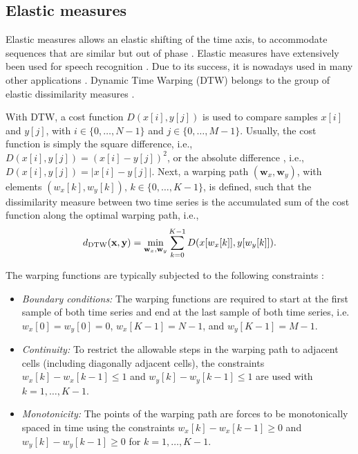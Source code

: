 \documentclass[10pt,final,a4paper,oneside,onecolumn]{article}
\newcommand{\ddtw}{d_{\textup{DTW}}}
\theoremstyle{plain}\newtheorem{definition}{Definition}[section]    %
\theoremstyle{definition}\newtheorem{example}{Example}[section]     %
\theoremstyle{remark}\newtheorem{remarkenv}{Remark}[section]        %
\begin{document}
\subsection{Elastic measures}
\label{sec:elastic measures}

Elastic measures allows an elastic shifting of the time axis, to accommodate sequences that are similar but out of phase \cite{keogh2005exactDTW}. Elastic measures have extensively been used for speech recognition \cite{rabiner1993speech, muller2007information}. Due to its success, it is nowadays used in many other applications \cite{serra2014empirical, wang2013distancemeasures}. Dynamic Time Warping (DTW) \cite{sakoe1978dynamic, berndt1994using} belongs to the group of elastic dissimilarity measures \cite{wang2013distancemeasures}.

With DTW, a cost function $D(x[i], y[j])$ is used to compare samples $x[i]$ and $y[j]$, with $i \in \{0, \ldots, N-1\}$ and $j \in \{0, \ldots, M-1\}$. Usually, the cost function is simply the square difference, i.e., $D(x[i], y[j]) = (x[i]-y[j])^2$, or the absolute difference \cite{berndt1994using}, i.e., $D(x[i], y[j])=|x[i] - y[j]|$. Next, a warping path $(\textbf{w}_x, \textbf{w}_y)$, with elements $(w_x[k], w_y[k]),\,k \in \{0, \ldots, K-1\}$, is defined, such that the dissimilarity measure between two time series is the accumulated sum of the cost function along the optimal warping path, i.e.,
\begin{equation} \label{eq:dtw cost}
	\ddtw(\textbf{x}, \textbf{y}) = \min_{\textbf{w}_x, \textbf{w}_y} \sum_{k=0}^{K-1} D(x[w_x[k]], y[w_y[k]]).
\end{equation}

The warping functions are typically subjected to the following constraints \cite{keogh2005exactDTW}:
\begin{itemize}
	\item \emph{Boundary conditions:} The warping functions are required to start at the first sample of both time series and end at the last sample of both time series, i.e. $w_x[0]=w_y[0]=0$, $w_x[K-1]=N-1$, and $w_y[K-1]=M-1$. 
	\item \emph{Continuity:} To restrict the allowable steps in the warping path to adjacent cells (including diagonally adjacent cells), the constraints $w_x[k] - w_x[k-1] \leq 1$ and $w_y[k] - w_y[k-1] \leq 1$ are used with $k=1, \ldots, K-1$.
	\item \emph{Monotonicity:} The points of the warping path are forces to be monotonically spaced in time using the constraints $w_x[k] - w_x[k-1] \geq 0$ and $w_y[k] - w_y[k-1] \geq 0$ for $k=1, \ldots, K-1$. 
\end{itemize}
\end{document}
